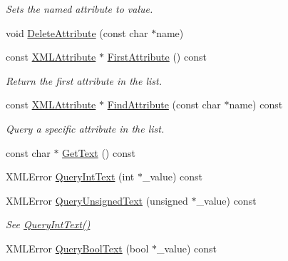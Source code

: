 \begin{DoxyCompactItemize}
\begin{DoxyCompactList}\small\item\em Sets the named attribute to value. \end{DoxyCompactList}\item 
void \hyperlink{classtinyxml2_1_1_x_m_l_element_a58954684e08e9d1fea08e632a0a1d1c2}{Delete\-Attribute} (const char $\ast$name)
\item 
\hypertarget{classtinyxml2_1_1_x_m_l_element_abd5e8924d6dd063c710d72fd45f94fd3}{const \hyperlink{classtinyxml2_1_1_x_m_l_attribute}{X\-M\-L\-Attribute} $\ast$ \hyperlink{classtinyxml2_1_1_x_m_l_element_abd5e8924d6dd063c710d72fd45f94fd3}{First\-Attribute} () const }\label{classtinyxml2_1_1_x_m_l_element_abd5e8924d6dd063c710d72fd45f94fd3}

\begin{DoxyCompactList}\small\item\em Return the first attribute in the list. \end{DoxyCompactList}\item 
\hypertarget{classtinyxml2_1_1_x_m_l_element_aa32e791da925197f092891d0293d606b}{const \hyperlink{classtinyxml2_1_1_x_m_l_attribute}{X\-M\-L\-Attribute} $\ast$ \hyperlink{classtinyxml2_1_1_x_m_l_element_aa32e791da925197f092891d0293d606b}{Find\-Attribute} (const char $\ast$name) const }\label{classtinyxml2_1_1_x_m_l_element_aa32e791da925197f092891d0293d606b}

\begin{DoxyCompactList}\small\item\em Query a specific attribute in the list. \end{DoxyCompactList}\item 
const char $\ast$ \hyperlink{classtinyxml2_1_1_x_m_l_element_a7c19a89c281cdcf2aece75a9c7bbc680}{Get\-Text} () const 
\item 
X\-M\-L\-Error \hyperlink{classtinyxml2_1_1_x_m_l_element_aa7c5d934a33df439c4e81533571c9267}{Query\-Int\-Text} (int $\ast$\-\_\-value) const 
\item 
\hypertarget{classtinyxml2_1_1_x_m_l_element_a3c948d2a95d4561de4ba2e6715533775}{X\-M\-L\-Error \hyperlink{classtinyxml2_1_1_x_m_l_element_a3c948d2a95d4561de4ba2e6715533775}{Query\-Unsigned\-Text} (unsigned $\ast$\-\_\-value) const }\label{classtinyxml2_1_1_x_m_l_element_a3c948d2a95d4561de4ba2e6715533775}

\begin{DoxyCompactList}\small\item\em See \hyperlink{classtinyxml2_1_1_x_m_l_element_aa7c5d934a33df439c4e81533571c9267}{Query\-Int\-Text()} \end{DoxyCompactList}\item 
\hypertarget{classtinyxml2_1_1_x_m_l_element_a6562a6f6e198bab6653d2d0d62c8af70}{X\-M\-L\-Error \hyperlink{classtinyxml2_1_1_x_m_l_element_a6562a6f6e198bab6653d2d0d62c8af70}{Query\-Bool\-Text} (bool $\ast$\-\_\-value) const }\label{classtinyxml2_1_1_x_m_l_element_a6562a6f6e198bab6653d2d0d62c8af70}


\end{DoxyCompactItemize}

